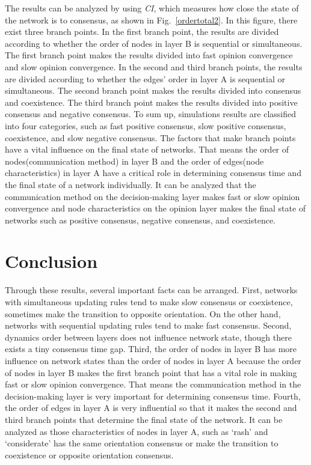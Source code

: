 The results can be analyzed by using \textit{CI}, which measures how close the state of the network is to consensus, as shown in Fig.~\ref{ordertotal2}. In this figure, there exist three branch points. In the first branch point, the results are divided according to whether the order of nodes in layer B is sequential or simultaneous. The first branch point makes the results divided into fast opinion convergence and slow opinion convergence. In the second and third branch points, the results are divided according to whether the edges' order in layer A is sequential or simultaneous. The second branch point makes the results divided into consensus and coexistence. The third branch point makes the results divided into positive consensus and negative consensus. To sum up, simulations results are classified into four categories, such as fast positive consensus, slow positive consensus, coexistence, and slow negative consensus. The factors that make branch points have a vital influence on the final state of networks. That means the order of nodes(communication method) in layer B and the order of edges(node characteristics) in layer A have a critical role in determining consensus time and the final state of a network individually. It can be analyzed that the communication method on the decision-making layer makes fast or slow opinion convergence and node characteristics on the opinion layer makes the final state of networks such as positive consensus, negative consensus, and coexistence. \\

\section{Conclusion}
Through these results, several important facts can be arranged. First, networks with simultaneous updating rules tend to make slow consensus or coexistence, sometimes make the transition to opposite orientation. On the other hand, networks with sequential updating rules tend to make fast consensus. Second, dynamics order between layers does not influence network state, though there exists a tiny consensus time gap. Third, the order of nodes in layer B has more influence on network states than the order of nodes in layer A because the order of nodes in layer B makes the first branch point that has a vital role in making fast or slow opinion convergence. That means the communication method in the decision-making layer is very important for determining consensus time. Fourth, the order of edges in layer A is very influential so that it makes the second and third branch points that determine the final state of the network. It can be analyzed as those characteristics of nodes in layer A, such as `rash' and `considerate' has the same orientation consensus or make the transition to coexistence or opposite orientation consensus.\\



